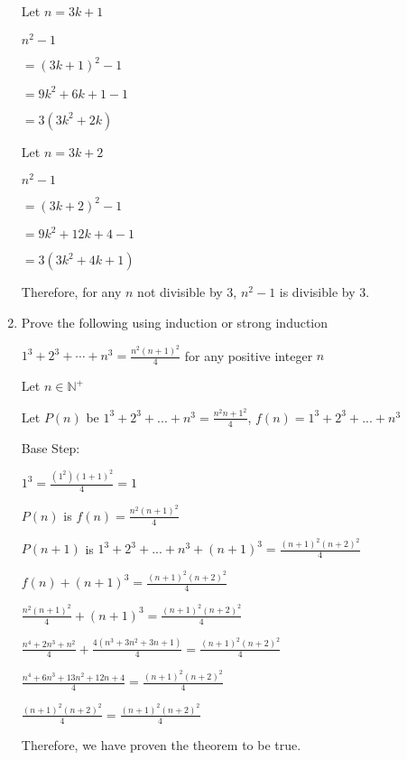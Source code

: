 \documentclass[12pt,twoside]{article}
\begin{document}
\begin{enumerate}
	Let $n = 3k + 1$

	$n^2 - 1$

	$= (3k + 1)^2 - 1$

	$= 9k^2 + 6k + 1 - 1$

	$= 3(3k^2 + 2k)$

	Let $n = 3k  + 2$

	$n^2 - 1$

	$= (3k + 2)^2 - 1$

	$= 9k^2 + 12k + 4 - 1$

	$= 3(3k^2 + 4k + 1)$

	Therefore, for any $n$ not divisible by $3$, $n^2 - 1$ is divisible by $3$.
 	\newpage

\item Prove the following using induction or strong induction

    $1^3 + 2^3 + \cdots + n^3 = \frac{n^2(n+1)^2}{4}$ for any positive integer $n$

	Let $n \in \mathbb{N}^+$

	Let $P(n)$ be $1^3 + 2^3 + ... + n^3 = \frac{{n^2}{n+1}^2}{4}$, $f(n) = 1^3 + 2^3 + ... + n^3$

	Base Step:

	$1^3 = \frac{(1^2)(1+1)^2}{4} = 1$

	$P(n)$ is $f(n) = \frac{n^2(n+1)^2}{4}$

	$P(n+1)$ is $1^3 + 2^3 + ... + n^3 + (n+1)^3 = \frac{(n+1)^2(n+2)^2}{4}$

	$f(n) + (n+1)^3 = \frac{(n+1)^2(n+2)^2}{4}$

	$\frac{n^2(n+1)^2}{4} + (n+1)^3 = \frac{(n+1)^2(n+2)^2}{4}$

	$\frac{n^4 + 2n^3 + n^2}{4} + \frac{4(n^3 + 3n^2 + 3n + 1)}{4}= \frac{(n+1)^2(n+2)^2}{4}$

	$\frac{n^4 + 6n^3 + 13n^2 + 12n + 4}{4} = \frac{(n+1)^2(n+2)^2}{4}$

	$\frac{(n+1)^2(n+2)^2}{4} = \frac{(n+1)^2(n+2)^2}{4}$

	Therefore, we have proven the theorem to be true.
\end{enumerate}
\end{document}
